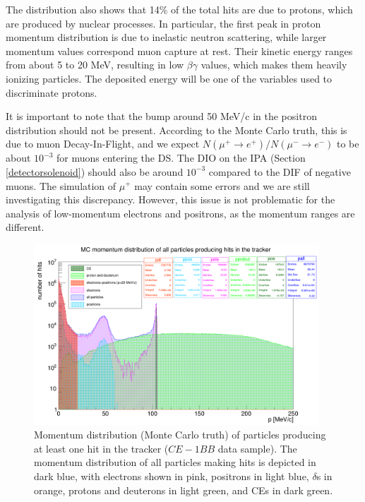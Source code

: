 The distribution also shows that 14\% of 
the total hits are due to protons, 
which are produced by nuclear processes. 
In particular, the first peak in proton  
momentum distribution is due to  
inelastic neutron scattering, while 
larger momentum values correspond muon 
capture at rest.
Their kinetic energy ranges from about 
5 to 20 MeV, resulting in low $\beta \gamma$ values, 
which makes them heavily ionizing particles. 
The deposited energy will be 
one of the variables used to discriminate protons. 

It is important to note that the bump 
around 50 MeV/c in 
the positron distribution should not be 
present. According 
to the Monte Carlo truth, this is due to 
muon Decay-In-Flight, 
and we expect 
$N(\mu^+ \rightarrow e^+ )/N(\mu^- \rightarrow e^- )$ 
to be about $10^{-3}$ 
for muons entering the DS. The DIO on the IPA 
(Section \ref{detectorsolenoid}) 
should also be around 
$10^{-3}$ compared to the DIF of 
negative muons. 
The simulation of $\mu^+$ may 
contain some errors and we are still 
investigating this discrepancy. 
However, this issue is not problematic for the analysis 
of low-momentum electrons and positrons, 
as the momentum ranges are different.

\begin{figure}[!h]
        \centering
        \includegraphics[width =0.95\textwidth]{figures/png/Screenshot_20240812_152905.png}
    \caption[Monte Carlo momentum distribution 
    of particles producing hits in the Mu2e 
    tracker ($CE-1BB$ data sample).]{
        Momentum distribution (Monte Carlo truth)  
       of particles producing at 
       least one hit in the tracker 
       ($CE-1BB$ data sample).  
       The momentum distribution 
       of all particles making hits is 
       depicted in dark blue, with electrons 
       shown in pink, positrons in light 
       blue, $\delta$s in orange, protons 
       and deuterons in 
       light green, and CEs in dark green. }
       \label{fig:momhits}
\end{figure}


